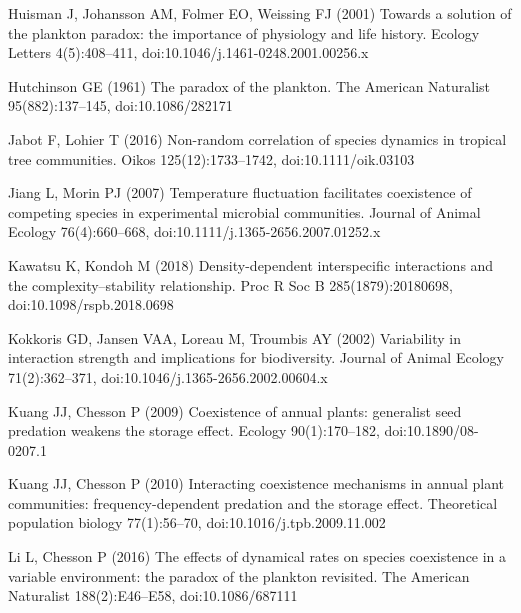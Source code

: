 \documentclass[a4paper,12pt]{article}
\begin{document}
\begin{thebibliography}{68}
Huisman J, Johansson AM, Folmer EO, Weissing FJ (2001) Towards a solution of
  the plankton paradox: the importance of physiology and life history. Ecology
  Letters 4(5):408--411, doi:{10.1046/j.1461-0248.2001.00256.x}

Hutchinson GE (1961) The paradox of the plankton. The American Naturalist
  95(882):137--145, doi:{10.1086/282171}

Jabot F, Lohier T (2016) Non-random correlation of species dynamics in tropical
  tree communities. Oikos 125(12):1733--1742, doi:{10.1111/oik.03103}

Jiang L, Morin PJ (2007) Temperature fluctuation facilitates coexistence of
  competing species in experimental microbial communities. Journal of Animal
  Ecology 76(4):660--668, doi:{10.1111/j.1365-2656.2007.01252.x}

Kawatsu K, Kondoh M (2018) Density-dependent interspecific interactions and the
  complexity--stability relationship. Proc R Soc B 285(1879):20180698,
  doi:{10.1098/rspb.2018.0698}

Kokkoris GD, Jansen VAA, Loreau M, Troumbis AY (2002) Variability in
  interaction strength and implications for biodiversity. Journal of Animal
  Ecology 71(2):362--371, doi:{10.1046/j.1365-2656.2002.00604.x}

Kuang JJ, Chesson P (2009) Coexistence of annual plants: generalist seed
  predation weakens the storage effect. Ecology 90(1):170--182,
  doi:{10.1890/08-0207.1}

Kuang JJ, Chesson P (2010) Interacting coexistence mechanisms in annual plant
  communities: frequency-dependent predation and the storage effect.
  Theoretical population biology 77(1):56--70, doi:{10.1016/j.tpb.2009.11.002}

Li L, Chesson P (2016) The effects of dynamical rates on species coexistence in
  a variable environment: the paradox of the plankton revisited. The American
  Naturalist 188(2):E46--E58, doi:{10.1086/687111}


\end{thebibliography}
\end{document}

